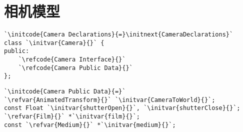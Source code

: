 \section{相机模型}\label{sec:相机模型}

\begin{lstlisting}
`\initcode{Camera Declarations}{=}\initnext{CameraDeclarations}`
class `\initvar{Camera}{}` {
public:
    `\refcode{Camera Interface}{}`
    `\refcode{Camera Public Data}{}`
};
\end{lstlisting}

\begin{lstlisting}
`\initcode{Camera Public Data}{=}`
`\refvar{AnimatedTransform}{}` `\initvar{CameraToWorld}{}`;
const Float `\initvar{shutterOpen}{}`, `\initvar{shutterClose}{}`;
`\refvar{Film}{}` *`\initvar{film}{}`;
const `\refvar{Medium}{}` *`\initvar{medium}{}`;
\end{lstlisting}